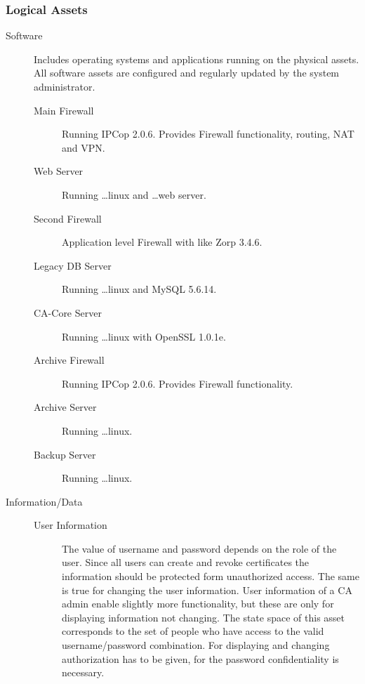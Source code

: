 \documentclass{article}
\begin{document}
\subsubsection{Logical Assets}
\begin{description}
\item[Software] Includes operating systems and applications running on the physical assets. All software assets are configured and regularly updated by the system administrator.
\begin{description}
\item[Main Firewall] Running IPCop 2.0.6. Provides Firewall functionality, routing, NAT and VPN.  

\item[Web Server] Running \dots linux and \dots web server. 

\item[Second Firewall] Application level Firewall with like Zorp 3.4.6. 

\item[Legacy DB Server] Running \dots linux and MySQL 5.6.14. 

\item[CA-Core Server] Running \dots linux with OpenSSL 1.0.1e.

\item[Archive Firewall] Running IPCop 2.0.6. Provides Firewall functionality.

\item[Archive Server] Running \dots linux. 

\item[Backup Server] Running \dots linux. 

\end{description}
\item[Information/Data]
\begin{description}

\item[User Information] The value of username and password depends on the role of the user. Since all users can create and revoke certificates the information should be protected form unauthorized access. The same is true for changing the user information. User information of a CA admin enable slightly more functionality, but these are only for displaying information not changing.  The state space of this asset corresponds to the set of people who have access to the valid username/password combination. For displaying and changing authorization has to be given, for the password confidentiality is necessary.


\end{description}
\end{description}
\end{document}
